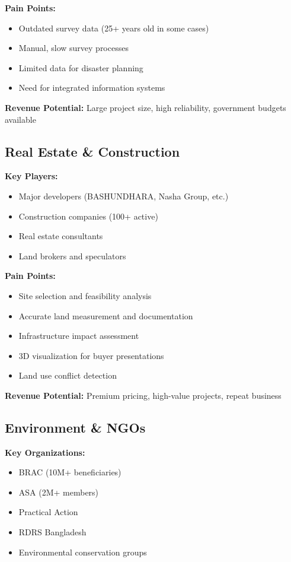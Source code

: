 \textbf{Pain Points:}
\begin{itemize}
    \item Outdated survey data (25+ years old in some cases)
    \item Manual, slow survey processes
    \item Limited data for disaster planning
    \item Need for integrated information systems
\end{itemize}

\textbf{Revenue Potential:} Large project size, high reliability, government budgets available

\subsection{Real Estate \& Construction}

\textbf{Key Players:}
\begin{itemize}
    \item Major developers (BASHUNDHARA, Nasha Group, etc.)
    \item Construction companies (100+ active)
    \item Real estate consultants
    \item Land brokers and speculators
\end{itemize}

\textbf{Pain Points:}
\begin{itemize}
    \item Site selection and feasibility analysis
    \item Accurate land measurement and documentation
    \item Infrastructure impact assessment
    \item 3D visualization for buyer presentations
    \item Land use conflict detection
\end{itemize}

\textbf{Revenue Potential:} Premium pricing, high-value projects, repeat business

\subsection{Environment \& NGOs}

\textbf{Key Organizations:}
\begin{itemize}
    \item BRAC (10M+ beneficiaries)
    \item ASA (2M+ members)
    \item Practical Action
    \item RDRS Bangladesh
    \item Environmental conservation groups
\end{itemize}

